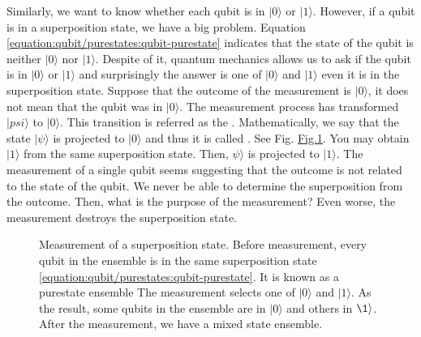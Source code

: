 \documentclass[letterpaper,10pt,english]{jupyterBook}
\let\sphinxpxdimen\pdfpxdimen\else\newdimen\sphinxpxdimen
\begin{document}
\sphinxAtStartPar
Similarly, we want to know whether each qubit is in \(|0\rangle\) or \(|1\rangle\). However, if a qubit is in a superposition state, we have a big problem.  Equation \eqref{equation:qubit/purestates:qubit-purestate} indicates that the state of the qubit is neither \(|0\rangle\) nor \(|1\rangle\).  Despite of it, quantum mechanics allows us to ask if the qubit is in \(|0\rangle\) or \(|1\rangle\) and surprisingly the answer is one of \(|0\rangle\) and \(|1\rangle\) even it is in the superposition state. Suppose that the outcome of the measurement is \(|0\rangle\), it does not mean that the qubit was in \(|0\rangle\).  The measurement process has transformed \(|psi\rangle\) to \(|0\rangle\). This transition is referred as the . Mathematically, we say that the state \(|\psi\rangle\) is projected to \(|0\rangle\) and thus it is called . See Fig. \hyperref[\detokenize{qubit/measurement:measurement-purestate}]{Fig.\@ \ref{\detokenize{qubit/measurement:measurement-purestate}}}.   You may obtain \(|1\rangle\) from the same superposition state. Then, \(\psi\rangle\) is projected to \(|1\rangle\). The measurement of a single qubit seems suggesting that the outcome is not related to the state of the qubit. We never be able to determine the superposition from the outcome. Then, what is the purpose of the measurement?   Even worse, the measurement destroys the superposition state.

\begin{figure}[htbp]
\centering
\capstart

\noindent\sphinxincludegraphics[width=400\sphinxpxdimen]{{measurement-purestate}.png}
\caption{Measurement of a superposition state.  Before measurement, every qubit in the ensemble is in the same superposition state \eqref{equation:qubit/purestates:qubit-purestate}.  It is known as a purestate ensemble  The measurement selects one of \(|0\rangle\) and \(|1\rangle\).  As the result, some qubits in the ensemble are in \(|0\rangle\) and others in \(\1\rangle\). After the measurement, we have a mixed state ensemble.}\label{\detokenize{qubit/measurement:measurement-purestate}}\end{figure}
\end{document}
